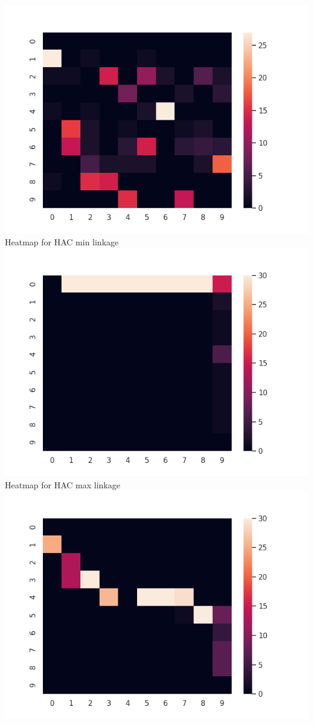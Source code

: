 \documentclass[submit]{harvardml}
\begin{document}
\begin{enumerate}
\begin{center}
    \includegraphics[scale=.70]{hw4/Pics/Part7_K.png}\newline
    Heatmap for HAC min linkage\newline
    \includegraphics[scale=.70]{hw4/Pics/Part7_min.png}\newline
    Heatmap for HAC max linkage\newline
    \includegraphics[scale=.70]{hw4/Pics/Part7_max.png}\newline

\end{center}
\end{enumerate}
\end{document}
